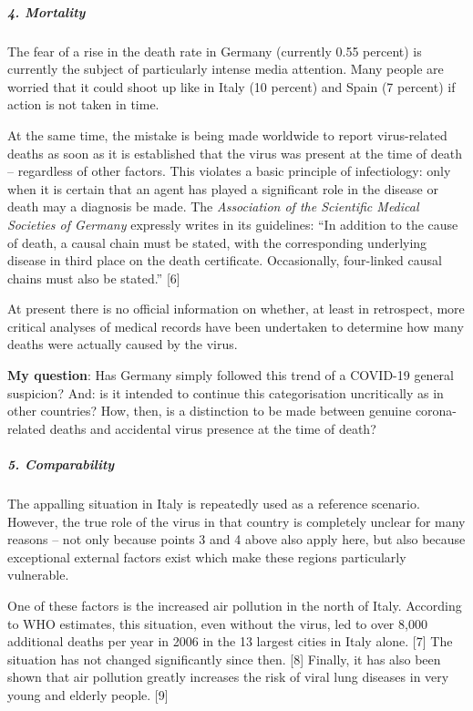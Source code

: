 \hypertarget{4-mortality}{%
\subparagraph{\texorpdfstring{\textbf{4.
Mortality}}{4. Mortality}}\label{4-mortality}}

The fear of a rise in the death rate in Germany (currently 0.55 percent)
is currently the subject of particularly intense media attention. Many
people are worried that it could shoot up like in Italy (10 percent) and
Spain (7 percent) if action is not taken in time.

At the same time, the mistake is being made worldwide to report
virus-related deaths as soon as it is established that the virus was
present at the time of death -- regardless of other factors. This
violates a basic principle of infectiology: only when it is certain that
an agent has played a significant role in the disease or death may a
diagnosis be made. The \emph{Association of the Scientific Medical
Societies of Germany} expressly writes in its guidelines: ``In addition
to the cause of death, a causal chain must be stated, with the
corresponding underlying disease in third place on the death
certificate. Occasionally, four-linked causal chains must also be
stated.'' {[}6{]}

At present there is no official information on whether, at least in
retrospect, more critical analyses of medical records have been
undertaken to determine how many deaths were actually caused by the
virus.

\textbf{My question}: Has Germany simply followed this trend of a
COVID-19 general suspicion? And: is it intended to continue this
categorisation uncritically as in other countries? How, then, is a
distinction to be made between genuine corona-related deaths and
accidental virus presence at the time of death?

\hypertarget{5-comparability}{%
\subparagraph{\texorpdfstring{\textbf{5.
Comparability}}{5. Comparability}}\label{5-comparability}}

The appalling situation in Italy is repeatedly used as a reference
scenario. However, the true role of the virus in that country is
completely unclear for many reasons -- not only because points 3 and 4
above also apply here, but also because exceptional external factors
exist which make these regions particularly vulnerable.

One of these factors is the increased air pollution in the north of
Italy. According to WHO estimates, this situation, even without the
virus, led to over 8,000 additional deaths per year in 2006 in the 13
largest cities in Italy alone. {[}7{]} The situation has not changed
significantly since then. {[}8{]} Finally, it has also been shown that
air pollution greatly increases the risk of viral lung diseases in very
young and elderly people. {[}9{]}

